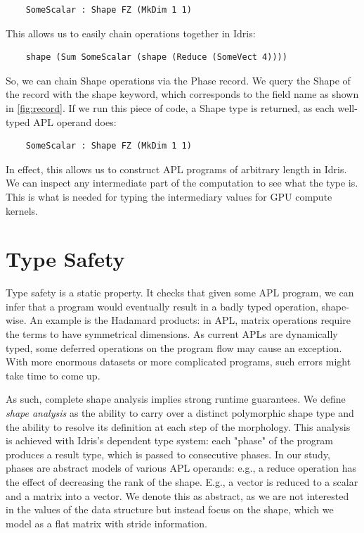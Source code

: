 \documentclass{report}
\begin{document}
\begin{verbatim}
    SomeScalar : Shape FZ (MkDim 1 1)
\end{verbatim}

This allows us to easily chain operations together in Idris:

\begin{verbatim}
    shape (Sum SomeScalar (shape (Reduce (SomeVect 4))))
\end{verbatim}

So, we can chain Shape operations via the Phase record. We query the Shape of the record with the shape keyword, which corresponds to the field name as shown in \ref{fig:record}. If we run this piece of code, a Shape type is returned, as each well-typed APL operand does:

\begin{verbatim}
    SomeScalar : Shape FZ (MkDim 1 1)
\end{verbatim}

In effect, this allows us to construct APL programs of arbitrary length in Idris. We can inspect any intermediate part of the computation to see what the type is. This is what is needed for typing the intermediary values for GPU compute kernels.

\section{Type Safety}
\label{sc:type}

Type safety is a static property. It checks that given some APL program, we can infer that a program would eventually result in a badly typed operation, shape-wise. An example is the Hadamard products: in APL, matrix operations require the terms to have symmetrical dimensions. As current APLs are dynamically typed, some deferred operations on the program flow may cause an exception. With more enormous datasets or more complicated programs, such errors might take time to come up.

As such, complete shape analysis implies strong runtime guarantees. We define \emph{shape analysis} as the ability to carry over a distinct polymorphic shape type and the ability to resolve its definition at each step of the morphology. This analysis is achieved with Idris's dependent type system: each "phase" of the program produces a result type, which is passed to consecutive phases. In our study, phases are abstract models of various APL operands: e.g., a reduce operation has the effect of decreasing the rank of the shape. E.g., a vector is reduced to a scalar and a matrix into a vector. We denote this as abstract, as we are not interested in the values of the data structure but instead focus on the shape, which we model as a flat matrix with stride information.
\end{document}
